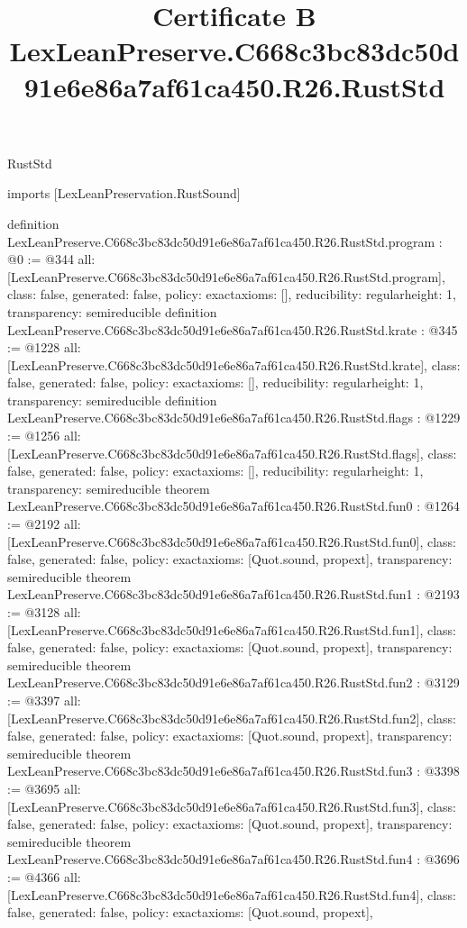 \begin{lexlean}{RustStd}
\title{Certificate B LexLeanPreserve.C668c3bc83dc50d91e6e86a7af61ca450.R26.RustStd}
\begin{coremodule}
imports [LexLeanPreservation.RustSound]

definition LexLeanPreserve.C668c3bc83dc50d91e6e86a7af61ca450.R26.RustStd.program : @0 := @344 {
  all: [LexLeanPreserve.C668c3bc83dc50d91e6e86a7af61ca450.R26.RustStd.program],
  class: false,
  generated: false,
  policy: exact{axioms: []},
  reducibility: regular{height: 1},
  transparency: semireducible
}
definition LexLeanPreserve.C668c3bc83dc50d91e6e86a7af61ca450.R26.RustStd.krate : @345 := @1228 {
  all: [LexLeanPreserve.C668c3bc83dc50d91e6e86a7af61ca450.R26.RustStd.krate],
  class: false,
  generated: false,
  policy: exact{axioms: []},
  reducibility: regular{height: 1},
  transparency: semireducible
}
definition LexLeanPreserve.C668c3bc83dc50d91e6e86a7af61ca450.R26.RustStd.flags : @1229 := @1256 {
  all: [LexLeanPreserve.C668c3bc83dc50d91e6e86a7af61ca450.R26.RustStd.flags],
  class: false,
  generated: false,
  policy: exact{axioms: []},
  reducibility: regular{height: 1},
  transparency: semireducible
}
theorem LexLeanPreserve.C668c3bc83dc50d91e6e86a7af61ca450.R26.RustStd.fun0 : @1264 := @2192 {
  all: [LexLeanPreserve.C668c3bc83dc50d91e6e86a7af61ca450.R26.RustStd.fun0],
  class: false,
  generated: false,
  policy: exact{axioms: [Quot.sound, propext]},
  transparency: semireducible
}
theorem LexLeanPreserve.C668c3bc83dc50d91e6e86a7af61ca450.R26.RustStd.fun1 : @2193 := @3128 {
  all: [LexLeanPreserve.C668c3bc83dc50d91e6e86a7af61ca450.R26.RustStd.fun1],
  class: false,
  generated: false,
  policy: exact{axioms: [Quot.sound, propext]},
  transparency: semireducible
}
theorem LexLeanPreserve.C668c3bc83dc50d91e6e86a7af61ca450.R26.RustStd.fun2 : @3129 := @3397 {
  all: [LexLeanPreserve.C668c3bc83dc50d91e6e86a7af61ca450.R26.RustStd.fun2],
  class: false,
  generated: false,
  policy: exact{axioms: [Quot.sound, propext]},
  transparency: semireducible
}
theorem LexLeanPreserve.C668c3bc83dc50d91e6e86a7af61ca450.R26.RustStd.fun3 : @3398 := @3695 {
  all: [LexLeanPreserve.C668c3bc83dc50d91e6e86a7af61ca450.R26.RustStd.fun3],
  class: false,
  generated: false,
  policy: exact{axioms: [Quot.sound, propext]},
  transparency: semireducible
}
theorem LexLeanPreserve.C668c3bc83dc50d91e6e86a7af61ca450.R26.RustStd.fun4 : @3696 := @4366 {
  all: [LexLeanPreserve.C668c3bc83dc50d91e6e86a7af61ca450.R26.RustStd.fun4],
  class: false,
  generated: false,
  policy: exact{axioms: [Quot.sound, propext]},
}
\end{coremodule}
\end{lexlean}
